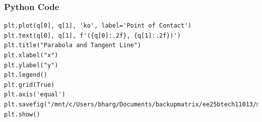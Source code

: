 \documentclass{beamer}
\begin{document}
\begin{frame}[fragile]
    \frametitle{Python Code}
    \begin{lstlisting}
plt.plot(q[0], q[1], 'ko', label='Point of Contact')
plt.text(q[0], q[1], f'({q[0]:.2f}, {q[1]:.2f})')
plt.title("Parabola and Tangent Line")
plt.xlabel("x")
plt.ylabel("y")
plt.legend()
plt.grid(True)
plt.axis('equal')
plt.savefig("/mnt/c/Users/bharg/Documents/backupmatrix/ee25btech11013/matgeo/10.3.12/figs/Figure_1.png")
plt.show()


    \end{lstlisting}
\end{frame}
\end{document}
